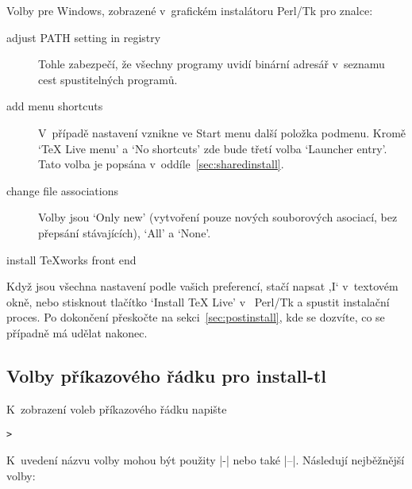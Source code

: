\documentclass[\classoptions,slovak,english,czech]{\classname}
\newcommand{\singleuv}[1]{,#1`}
\begin{document}
Volby pre Windows, zobrazené v~grafickém instalátoru Perl/Tk pro 
znalce:
\begin{description}
\item[adjust PATH setting in registry] 
Tohle zabezpečí, že všechny programy uvidí binární adresář 
\TL{} v~seznamu cest spustitelných programů.

\item[add menu shortcuts] V~případě nastavení vznikne ve Start menu
další položka \TL{} podmenu. Kromě `TeX Live menu' a `No shortcuts' 
zde bude třetí volba `Launcher entry'. Tato volba je popsána
v~oddíle~\ref{sec:sharedinstall}.

\item[change file associations] Volby jsou `Only new' (vytvoření 
pouze nových souborových asociací, bez přepsání stávajících), `All' a `None'.

\item[install \TeX{}works front end]
\end{description}
Když jsou všechna nastavení podle vašich preferencí, stačí napsat
\singleuv{I} v~textovém okně, nebo stisknout tlačítko `Install TeX Live' 
v~\GUI{} Perl/Tk a spustit instalační proces. Po dokončení přeskočte na
sekci~\ref{sec:postinstall}, kde se dozvíte, co se případně
má udělat nakonec. 

\subsection{Volby příkazového řádku pro install-tl}
\label{sec:cmdline}

K~zobrazení voleb příkazového řádku napište
\begin{alltt}
> 
\end{alltt}
K~uvedení názvu volby mohou být použity |-| nebo také |--|.
Následují nejběžnější volby:
\end{document}
